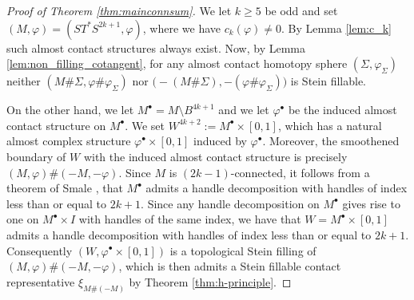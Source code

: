\documentclass[12pt]{amsart}
\theoremstyle{remark}
\begin{document}
\begin{proof}[Proof of Theorem \ref{thm:mainconnsum}]
We let $k \geq 5$ be odd and set $(M,\varphi) = (ST^*S^{2k{+}1},\varphi)$, where we have $c_k(\varphi) \neq 0$.
By Lemma \ref{lem:c_k} such almost contact structures always exist. 
Now, by Lemma \ref{lem:non_filling_cotangent}, for any almost contact homotopy sphere
$(\Sigma, \varphi_{\Sigma})$ neither 
$(M \# \Sigma, \varphi \# \varphi_{\Sigma})$
nor  $\bigl( -(M \# \Sigma), -(\varphi \# \varphi_{\Sigma}) \bigr)$ 
is Stein fillable.

On the other hand, we let $M^{\bullet} = M \setminus B^{4k{+}1}$ 
and we let $\varphi^{\bullet}$ be the induced almost contact structure on $M^\bullet$. 
We set $W^{4k+2} := M^\bullet \times [0,1]$,
which has a natural almost complex structure $\varphi^\bullet \times [0, 1]$ induced by
$\varphi^{\bullet}$. Moreover, the smoothened boundary of $W$ with the
induced almost contact structure is precisely 
$(M,\varphi) \# (-M, -\varphi)$. 
Since $M$ is $(2k{-}1)$-connected, it follows from a theorem of Smale \cite[Theorem C]{Smale61}, that $M^\bullet$ admits a handle decomposition with handles of index less than or equal to $2k{+}1$.
Since any handle decomposition on $M^\bullet$ gives rise to one on $M^\bullet \times I$ with handles of the same index, we have that $W = M^\bullet \times [0, 1]$  admits a handle decomposition with handles of index less than or equal to $2k{+}1$. 
Consequently $(W, \varphi^\bullet \times [0, 1])$
is a topological Stein filling of $(M, \varphi) \# (-M, -\varphi)$, 
which is then admits a Stein fillable contact representative 
$\xi _{M\# (-M)}$ by Theorem \ref{thm:h-principle}.
\end{proof}


\end{document}

